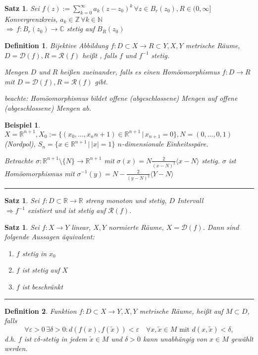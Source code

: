 \documentclass[ngerman,a4paper]{report}
\theoremstyle{break}
\newtheorem{example}[theorem]{Beispiel}
\newtheorem{satz}[theorem]{Satz}
\newtheorem*{definition}{Definition}
\newcommand{\highlight}[1]{\emph{#1}}
\renewcommand{\epsilon}{\varepsilon}
\begin{document}
\begin{satz}
	Sei $f(z) := \sum_{k=0}^\infty a_k(z-z_0)^k\,\forall z\in B_r(z_0), R\in(0,\infty]$ Konvergrenzkreis, $a_k\in\mathbb{Z}\, \forall k\in \mathbb{N}$\\
	$\Rightarrow\, f:B_r(z_0) \to \mathbb{C}$ stetig auf $B_R(z_0)$
\end{satz}
\addtocounter{theorem}{2}
\begin{definition}
	Bijektive Abbildung $f:D\subset X\to R\subset Y, X,Y$ metrische Räume, $D=\mathcal{D}(f), R=\mathcal{R}(f)$ heißt , falls $f$ und $f^{-1}$ stetig.
	
	Mengen $D$ und $R$ heißen  zueinander, falls es einen Homöomorphismus $f:D\to R$ mit $D=\mathcal{D}(f), R=\mathcal{R}(f)$ gibt.
	
	\highlight{beachte:} Homöomorphismus bildet offene (abgeschlossene) Mengen auf offene (abgeschlossene) Mengen ab.
\end{definition}
\begin{example}
	
	$X=\mathbb{R}^{n+1}, X_0 := \{(x_0, \dotsc, x_n{n+1}) \in\mathbb{R}^{n+1} \,|\, x_{n+1}=0\}, N = (0,\dotsc, 0,1)$ (Nordpol), $S_n = \{ x\in\mathbb{R}^{n+1} \,|\, |x|=1\}$ $n$-dimensionale Einheitsspäre.
	
	Betrachte $\sigma: \mathbb{R}^{n+1} \setminus\{ N\} \rightarrow \mathbb{R}^{n+1}$ mit $\sigma(x) = N \frac{2}{(x-N)^2}\langle x-N\rangle$ stetig. $\sigma$ ist Homöomorphismus mit $\sigma^{-1}(y) = N - \frac{2}{(y-N)^2}\langle Y-N\rangle$
\end{example}
\rule{4cm}{0.4pt}
\begin{satz}
	Sei $f:D\subset \mathbb{R}\to \mathbb{R}$ streng monoton und stetig, $D$ Intervall \\
	$\Rightarrow f^{-1}$ existiert und ist stetig auf $\mathcal{R}(f)$.
\end{satz}
\begin{satz}
	Sei $f:X\to Y$ linear, $X,Y$ normierte Räume, $X=\mathcal{D}(f)$. Dann sind folgende Aussagen äquivalent:
	\begin{enumerate}[label={\arabic*)}]
		\item $f$ stetig in $x_0$
		\item $f$ ist stetig auf $X$
		\item $f$ ist beschränkt
	\end{enumerate}
\end{satz}
\rule{4cm}{0.4pt}
\begin{definition}
	Funktion $f:D\subset X\to Y, X,Y$ metrische Räume, heißt  auf $M\subset D$, falls \[ \forall \epsilon > 0 \,\exists \delta > 0: d(f(x), f(\tilde{x})) < \epsilon\quad \forall x,\tilde{x}\in M \text{ mit $d(x,\tilde{x}) < \delta$}, \]
	d.h. $f$ ist $\epsilon\delta$-stetig in jedem $\tilde{x}\in M$ \highlight{und} $\delta > 0$ kann unabhängig von $x\in M$ gewählt werden.
\end{definition}
\end{document}
